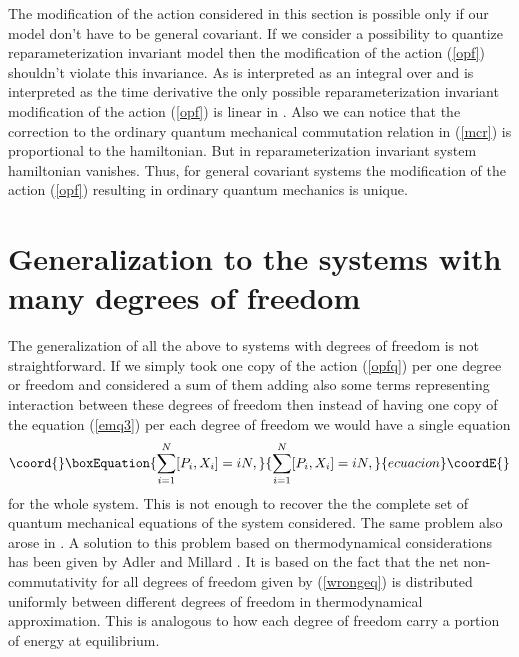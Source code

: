 \documentclass[a4paper,11pt]{article}
\begin{document}
The modification of the action considered in this section is
possible only if our model don't have to be general covariant. If
we consider a possibility to quantize reparameterization invariant
model then the modification of the action  (\ref{opf}) shouldn't
violate this invariance. As \coordHE{} is interpreted as an integral
over \coordHE{} and \coordHE{} is interpreted as the time derivative the only
possible reparameterization invariant modification of the action
(\ref{opf}) is linear in \coordHE{}. Also we can notice that the
correction to the ordinary quantum mechanical commutation relation
in (\ref{mcr}) is proportional to the hamiltonian. But in
reparameterization invariant system hamiltonian vanishes. Thus,
for general covariant systems the modification of the action
(\ref{opf}) resulting in ordinary quantum mechanics is unique.








\section{Generalization to the systems with many degrees of
freedom} \label{sec5}

 The generalization of all the above to systems
with \coordHE{} degrees of freedom is not straightforward. If we simply
took one copy of the action (\ref{opfq}) per one degree or freedom
and considered a sum of them adding also some terms representing
interaction between these degrees of freedom then instead of
having one copy of the equation (\ref{emq3}) per each degree of
freedom we would have a single equation
\begin{equation}\coord{}\boxEquation{
\sum\limits_{i=1}^{N} [P_i,X_i]=iN, \label{wrongeq}
}{
\sum\limits_{i=1}^{N} [P_i,X_i]=iN, }{ecuacion}\coordE{}\end{equation}
for the whole system. This is not enough to recover the the
complete set of quantum mechanical equations of the system
considered. The same problem also arose in \cite{adlerbook}. A
solution to this problem based on thermodynamical considerations
has been given by Adler and Millard \cite{adlermillard}. It is
based on the fact that the net non-commutativity for all degrees
of freedom given by (\ref{wrongeq}) is distributed uniformly
between different degrees of freedom in thermodynamical
approximation. This is analogous to how each degree of freedom
carry a \coordHE{} portion of energy at equilibrium.
\end{document}
